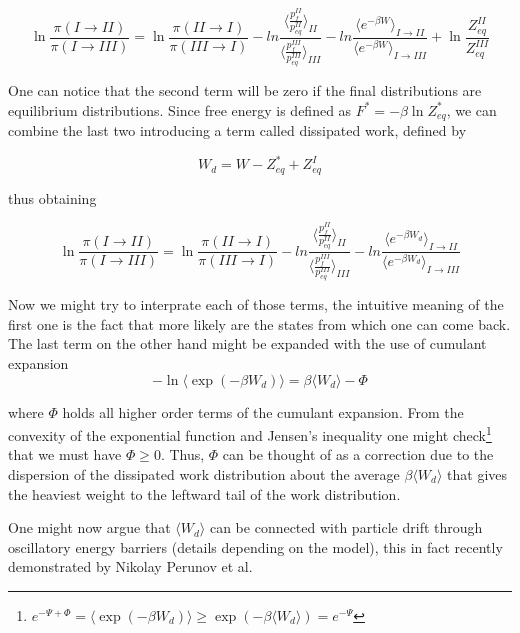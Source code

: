 \documentclass[a4paper,12pt]{article}
\begin{document}
\begin{equation}
  \ln \frac{\pi(I \to II)}{\pi(I \to III)} =
  \ln \frac{\pi(II \to I)}{\pi(III \to I)} - ln \frac{ \langle \frac{p_{f}^{II}}{p_{eq}^{II}}  \rangle_{II}}{ \langle \frac{p_{f}^{III}}{p_{eq}^{III}}  \rangle_{III} }
  -ln \frac{\langle e^{ - \beta W} \rangle_{I \to II}}{\langle e^{ - \beta W} \rangle_{I \to III}} + \ln{\frac{Z_{eq}^{II}}{Z_{eq}^{III} }}
\end{equation}

One can notice that the second term will be zero if the final distributions are equilibrium distributions. Since free energy is defined as $F^* = -\beta \ln Z_{eq}^*$, we can combine the last two introducing a term called dissipated work, defined by

\begin{equation}
  W_d =W - Z_{eq}^* + Z_{eq}^I
\end{equation}

thus obtaining

\begin{equation}
  \ln \frac{\pi(I \to II)}{\pi(I \to III)} =
  \ln \frac{\pi(II \to I)}{\pi(III \to I)} - ln \frac{ \langle \frac{p_{f}^{II}}{p_{eq}^{II}}  \rangle_{II}}{ \langle \frac{p_{f}^{III}}{p_{eq}^{III}}  \rangle_{III} }
  -ln \frac{\langle e^{ - \beta W_d} \rangle_{I \to II}}{\langle e^{ - \beta W_d} \rangle_{I \to III}} 
\end{equation}

Now we might try to interprate each of those terms, the intuitive meaning of the first one is the fact that more likely are the states from which one can come back. The last term on the other hand might be expanded with the use of cumulant expansion
\begin{equation}
  -\ln \langle \exp(-\beta W_d)\rangle= \beta \langle W_d \rangle - \Phi
\end{equation}

where $\Phi$ holds all higher order terms of the cumulant expansion. From the convexity of the exponential function and Jensen's inequality one might check\footnote{$e^{-\Psi + \Phi}=\langle \exp(-\beta W_d) \rangle \geq \exp(-\beta \langle W_d \rangle)= e^{-\Psi}$} that we must have $\Phi \geq 0$. Thus, $\Phi$ can be thought of as a correction due to the dispersion of the dissipated work distribution about the average $\beta \langle W_d \rangle $ that gives the heaviest weight to the leftward tail of the work distribution.\cite{Jarzynski:2006cq}

One might now argue that $\langle W_d \rangle $ can be connected with particle drift through oscillatory energy barriers (details depending on the model), this in fact recently demonstrated by Nikolay Perunov et al\cite{Perunov:2016hl}.
\end{document}

